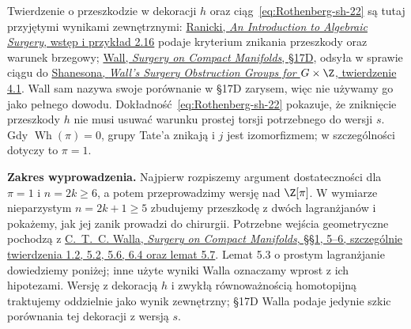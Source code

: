 Twierdzenie o przeszkodzie w dekoracji $h$
oraz ciąg~\eqref{eq:Rothenberg-sh-22} są tutaj
przyjętymi wynikami zewnętrznymi:
\href{https://www.maths.ed.ac.uk/~v1ranick/surgery/ranicki.pdf}
{Ranicki, \emph{An Introduction to Algebraic Surgery},
 wstęp i przykład 2.16} podaje kryterium
znikania przeszkody oraz warunek brzegowy;
\href{https://www.maths.ed.ac.uk/~v1ranick/books/scm.pdf}
{Wall, \emph{Surgery on Compact Manifolds}, §17D},
odsyła w sprawie ciągu do
\href{https://webhomes.maths.ed.ac.uk/~v1ranick/papers/shan.pdf}
{Shanesona, \emph{Wall's Surgery Obstruction
Groups for $G\times\Z$}, twierdzenie 4.1}.
Wall sam nazywa swoje porównanie w §17D
zarysem, więc nie używamy go jako pełnego dowodu.
Dokładność~\eqref{eq:Rothenberg-sh-22} pokazuje,
że zniknięcie przeszkody $h$ nie musi usuwać
warunku prostej torsji potrzebnego do wersji $s$.
Gdy $\operatorname{Wh}(\pi)=0$, grupy Tate'a
znikają i $j$ jest izomorfizmem; w szczególności
dotyczy to $\pi=1$.

\noindent\textbf{Zakres wyprowadzenia.}
Najpierw rozpiszemy argument dostateczności
dla $\pi=1$ i $n=2k\geq6$, a potem
przeprowadzimy wersję nad $\Z[\pi]$.
W wymiarze nieparzystym $n=2k+1\geq5$
zbudujemy przeszkodę z dwóch lagranżjanów
i pokażemy, jak jej zanik prowadzi do chirurgii.
Potrzebne wejścia geometryczne
pochodzą z
\href{https://webhomes.maths.ed.ac.uk/~v1ranick/books/scm.pdf}
{C.~T.~C. Walla, \emph{Surgery on Compact Manifolds},
§§1, 5--6, szczególnie twierdzenia 1.2, 5.2,
5.6, 6.4 oraz lemat 5.7}.
Lemat 5.3 o prostym lagranżjanie dowiedziemy
poniżej; inne użyte wyniki Walla oznaczamy
wprost z ich hipotezami. Wersję z dekoracją
$h$ i zwykłą równoważnością homotopijną
traktujemy oddzielnie jako wynik zewnętrzny;
§17D Walla podaje jedynie szkic porównania
tej dekoracji z wersją $s$.

